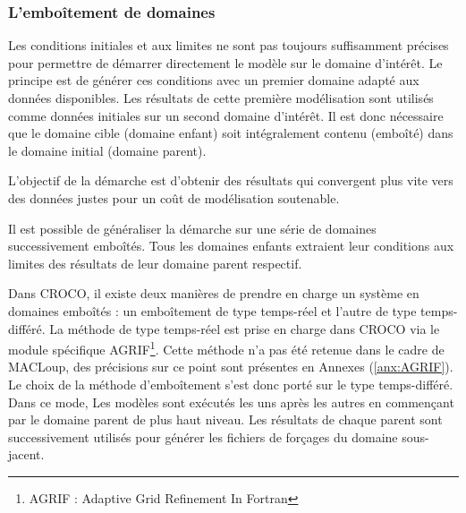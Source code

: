 \documentclass[10pt,a4paper,titlepage]{article}
\begin{document}
\subsubsection{L'emboîtement de domaines}
\label{subsub:enchainement_modelisations}

Les conditions initiales et aux limites ne sont pas toujours suffisamment précises pour permettre de démarrer directement le modèle sur le domaine d'intérêt.
Le principe est de générer ces conditions avec un premier domaine adapté aux données disponibles.
Les résultats de cette première modélisation sont utilisés comme données initiales sur un second domaine d'intérêt.
Il est donc nécessaire que le domaine cible (domaine enfant) soit intégralement contenu (emboîté) dans le domaine initial (domaine parent).

L'objectif de la démarche est d'obtenir des résultats qui convergent plus vite vers des données justes pour un coût de modélisation soutenable.

Il est possible de généraliser la démarche sur une série de domaines successivement emboîtés.
Tous les domaines enfants extraient leur conditions aux limites des résultats de leur domaine parent respectif.

Dans CROCO, il existe deux manières de prendre en charge un système en domaines emboîtés : un emboîtement de type temps-réel et l'autre de type temps-différé.
La méthode de type temps-réel est prise en charge dans CROCO via le module spécifique AGRIF\footnote{AGRIF : Adaptive Grid Refinement In Fortran}.
Cette méthode n'a pas été retenue dans le cadre de MACLoup, des précisions sur ce point sont présentes en Annexes (\ref{anx:AGRIF}).
Le choix de la méthode d'emboîtement s'est donc porté sur le type temps-différé.
Dans ce mode, Les modèles sont exécutés les uns après les autres en commençant par le domaine parent de plus haut niveau.
Les résultats de chaque parent sont successivement utilisés pour générer les fichiers de forçages du domaine sous-jacent.
\end{document}
